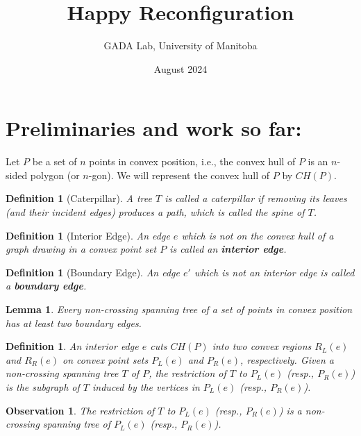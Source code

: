 \documentclass{article}
\title{Happy Reconfiguration}
\date{August 2024}
\author{GADA Lab, University of Manitoba}
\newtheorem{lemma}[theorem]{Lemma}
\newtheorem{observation}[theorem]{Observation}
\newtheorem{definition}[theorem]{Definition}
\begin{document}
\maketitle

\section{Preliminaries and work so far:}

Let $P$ be a set of $n$ points in convex position, i.e., the convex hull of $P$ is an $n$-sided polygon (or $n$-gon). We will represent the convex hull of $P$ by $CH(P)$.

\begin{definition}[Caterpillar]
	A tree $T$ is called a \emph{caterpillar} if removing its leaves (and their incident edges) produces a path, which is called the \emph{spine} of $T$.
\end{definition}

\begin{definition}[Interior Edge]
	An edge $e$ which is not on the convex hull of a graph drawing in a convex point set $P$ is called an \textbf{interior edge}.
\end{definition}

\begin{definition}[Boundary Edge]
	An edge $e'$ which is not an interior edge is called a \textbf{boundary edge}.
\end{definition}

\begin{lemma}
	\label{lem:two-boundary}
	Every non-crossing spanning tree of a set of points in convex position has at least two boundary edges.
\end{lemma}

\begin{definition}
	An interior edge $e$ cuts $CH(P)$ into two convex regions $R_L(e)$ and $R_R(e)$ on convex point sets $P_L(e)$ and $P_R(e)$, respectively. Given a non-crossing spanning tree $T$ of $P$, the \emph{restriction} of $T$ to $P_L(e)$ (resp., $P_R(e)$) is the subgraph of $T$ induced by the vertices in $P_L(e)$ (resp., $P_R(e)$).
\end{definition}

\begin{observation}
	\label{obs:restriction-is-nst}
	The restriction of $T$ to $P_L(e)$ (resp., $P_R(e)$) is a non-crossing spanning tree of $P_L(e)$ (resp., $P_R(e)$).
\end{observation}
\end{document}
